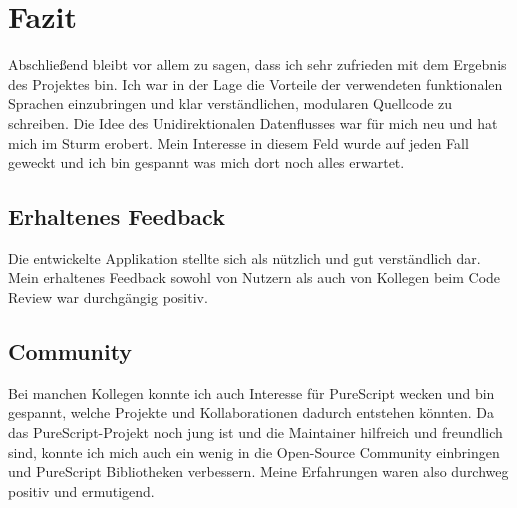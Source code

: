 \section{Fazit}
Abschließend bleibt vor allem zu sagen, dass ich sehr zufrieden mit
dem Ergebnis des Projektes bin. Ich war in der Lage die Vorteile der
verwendeten funktionalen Sprachen einzubringen und klar verständlichen,
modularen Quellcode zu schreiben. Die Idee des Unidirektionalen
Datenflusses war für mich neu und hat mich im Sturm erobert. Mein
Interesse in diesem Feld wurde auf jeden Fall geweckt und ich bin
gespannt was mich dort noch alles erwartet.

\subsection{Erhaltenes Feedback}
Die entwickelte Applikation stellte sich als nützlich und
gut verständlich dar. Mein erhaltenes Feedback sowohl von Nutzern als
auch von Kollegen beim Code Review war durchgängig positiv.

\subsection{Community}
Bei manchen Kollegen konnte ich auch Interesse für
PureScript wecken und bin gespannt, welche Projekte und
Kollaborationen dadurch entstehen könnten. Da das PureScript-Projekt
noch jung ist und die Maintainer hilfreich und freundlich sind, konnte
ich mich auch ein wenig in die Open-Source Community einbringen und
PureScript Bibliotheken verbessern. Meine Erfahrungen waren also
durchweg positiv und ermutigend.

